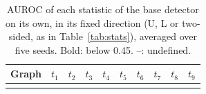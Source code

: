 \documentclass[pdflatex,sn-mathphys-ay]{sn-jnl}
\theoremstyle{plain}
\theoremstyle{remark}
\begin{document}
\begin{appendices}
\begin{table}[h]
\caption{AUROC of each statistic of the base detector on its own, in its fixed direction (U, L or two-sided, as in Table~\ref{tab:stats}), averaged over five seeds. Bold: below 0.45. --: undefined.}
\label{tab:diag}
\scriptsize
\setlength{\tabcolsep}{3pt}
\begin{tabular*}{\textwidth}{@{\extracolsep{\fill}}lccccccccc@{}}
\toprule
Graph & $t_1$ & $t_2$ & $t_3$ & $t_4$ & $t_5$ & $t_6$ & $t_7$ & $t_8$ & $t_9$ \\
\midrule

\botrule
\end{tabular*}
\end{table}
\clearpage

\end{appendices}


\end{document}
